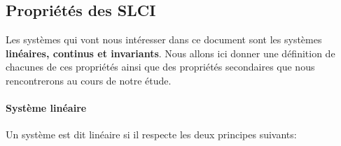 \subsection{Propriétés des SLCI}
Les systèmes qui vont nous intéresser dans ce document sont les systèmes
\textbf{linéaires, continus et invariants}. Nous allons ici donner une définition
de chacunes de ces propriétés ainsi que des propriétés secondaires que nous 
rencontrerons au cours de notre étude.

\paragraph{Système linéaire}

Un système est dit linéaire si il respecte les deux principes suivants:

